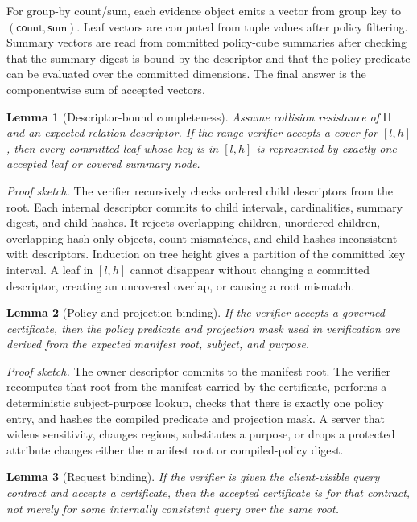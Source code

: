 \documentclass[conference]{IEEEtran}
\newcommand{\hash}{\mathsf{H}}
\newtheorem{lemma}{Lemma}
\begin{document}
For group-by count/sum, each evidence object emits a vector from group key to $(\mathsf{count},\mathsf{sum})$. Leaf vectors are computed from tuple values after policy filtering. Summary vectors are read from committed policy-cube summaries after checking that the summary digest is bound by the descriptor and that the policy predicate can be evaluated over the committed dimensions. The final answer is the componentwise sum of accepted vectors.

\begin{lemma}[Descriptor-bound completeness]
Assume collision resistance of $\hash$ and an expected relation descriptor. If the range verifier accepts a cover for $[l,h]$, then every committed leaf whose key is in $[l,h]$ is represented by exactly one accepted leaf or covered summary node.
\end{lemma}

\noindent\emph{Proof sketch.} The verifier recursively checks ordered child descriptors from the root. Each internal descriptor commits to child intervals, cardinalities, summary digest, and child hashes. It rejects overlapping children, unordered children, overlapping hash-only objects, count mismatches, and child hashes inconsistent with descriptors. Induction on tree height gives a partition of the committed key interval. A leaf in $[l,h]$ cannot disappear without changing a committed descriptor, creating an uncovered overlap, or causing a root mismatch.

\begin{lemma}[Policy and projection binding]
If the verifier accepts a governed certificate, then the policy predicate and projection mask used in verification are derived from the expected manifest root, subject, and purpose.
\end{lemma}

\noindent\emph{Proof sketch.} The owner descriptor commits to the manifest root. The verifier recomputes that root from the manifest carried by the certificate, performs a deterministic subject-purpose lookup, checks that there is exactly one policy entry, and hashes the compiled predicate and projection mask. A server that widens sensitivity, changes regions, substitutes a purpose, or drops a protected attribute changes either the manifest root or compiled-policy digest.

\begin{lemma}[Request binding]
If the verifier is given the client-visible query contract and accepts a certificate, then the accepted certificate is for that contract, not merely for some internally consistent query over the same root.
\end{lemma}
\end{document}
